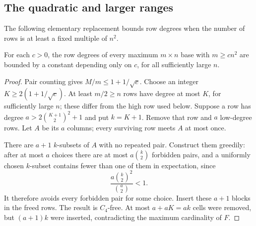\subsection{The quadratic and larger ranges}

The following elementary replacement bounds row degrees when the
number of rows is at least a fixed multiple of $n^2$.

\begin{lemma}\label{lem:bounded-row-trade}
For each $c>0$, the row degrees of every maximum $m\times n$ base
with $m\ge cn^2$ are bounded by a constant depending only on $c$,
for all sufficiently large $n$.
\end{lemma}
\begin{proof}
Pair counting gives $M/m\le1+1/\sqrt c$. Choose an integer
$K\ge2(1+1/\sqrt c)$. At least $m/2\ge n$ rows have degree at most
$K$, for sufficiently large $n$; these differ from the high row used below.
Suppose a row has degree $a>2\binom{K+1}{2}^2+1$ and put $k=K+1$.
Remove that row and $a$ low-degree rows. Let $A$ be its $a$ columns;
every surviving row meets $A$ at most once.

There are $a+1$ $k$-subsets of $A$ with no repeated pair. Construct
them greedily: after at most $a$ choices there are at most
$a\binom k2$ forbidden pairs, and a uniformly chosen $k$-subset
contains fewer than one of them in expectation, since
\[
 \frac{a\binom k2^2}{\binom a2}<1.
\]
It therefore avoids every forbidden pair for some choice.
Insert these $a+1$ blocks in the freed rows. The result is $C_4$-free.
At most $a+aK=ak$ cells were removed, but $(a+1)k$ were inserted,
contradicting the maximum cardinality of $F$.
\end{proof}

